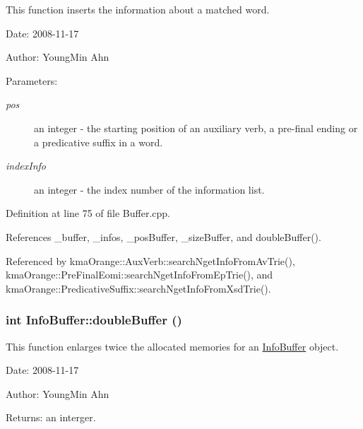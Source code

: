 This function inserts the information about a matched word. 

\begin{Desc}
\item[Date:]2008-11-17 \end{Desc}
\begin{Desc}
\item[Author:]YoungMin Ahn \end{Desc}
\begin{Desc}
\item[Parameters:]
\begin{description}
\item[{\em pos}]an integer - the starting position of an auxiliary verb, a pre-final ending or a predicative suffix in a word. \item[{\em indexInfo}]an integer - the index number of the information list. \end{description}
\end{Desc}


Definition at line 75 of file Buffer.cpp.

References \_\-buffer, \_\-infos, \_\-posBuffer, \_\-sizeBuffer, and doubleBuffer().

Referenced by kmaOrange::AuxVerb::searchNgetInfoFromAvTrie(), kmaOrange::PreFinalEomi::searchNgetInfoFromEpTrie(), and kmaOrange::PredicativeSuffix::searchNgetInfoFromXsdTrie().\hypertarget{classkmaOrange_1_1InfoBuffer_b8e1043fab6bd103c4cbcbd29aa0a348}{
\subsubsection[{doubleBuffer}]{\setlength{\rightskip}{0pt plus 5cm}int InfoBuffer::doubleBuffer ()}}
\label{classkmaOrange_1_1InfoBuffer_b8e1043fab6bd103c4cbcbd29aa0a348}


This function enlarges twice the allocated memories for an \hyperlink{classkmaOrange_1_1InfoBuffer}{InfoBuffer} object. 

\begin{Desc}
\item[Date:]2008-11-17 \end{Desc}
\begin{Desc}
\item[Author:]YoungMin Ahn \end{Desc}
\begin{Desc}
\item[Returns:]an interger. \end{Desc}


